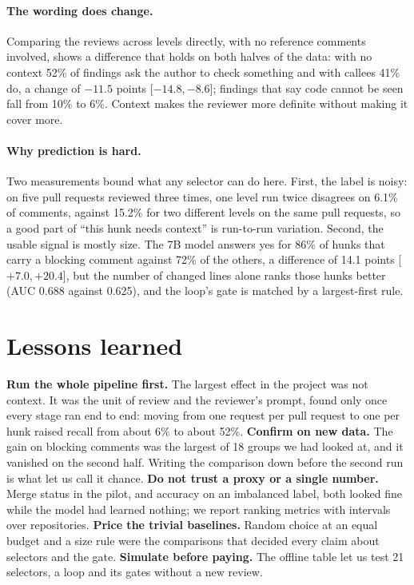 \documentclass{article}
\newcommand{\ci}[2]{[$#1$,\,$#2$]}
\begin{document}
\paragraph{The wording does change.} Comparing the reviews across levels directly, with no reference comments involved, shows a difference that holds on both halves of the data: with no context 52\% of findings ask the author to check something and with callees 41\% do, a change of $-11.5$ points \ci{-14.8}{-8.6}; findings that say code cannot be seen fall from 10\% to 6\%. Context makes the reviewer more definite without making it cover more.

\paragraph{Why prediction is hard.} Two measurements bound what any selector can do here. First, the label is noisy: on five pull requests reviewed three times, one level run twice disagrees on 6.1\% of comments, against 15.2\% for two different levels on the same pull requests, so a good part of ``this hunk needs context'' is run-to-run variation. Second, the usable signal is mostly size. The 7B model answers yes for 86\% of hunks that carry a blocking comment against 72\% of the others, a difference of 14.1 points \ci{+7.0}{+20.4}, but the number of changed lines alone ranks those hunks better (AUC 0.688 against 0.625), and the loop's gate is matched by a largest-first rule.

\section{Lessons learned}
\textbf{Run the whole pipeline first.} The largest effect in the project was not context. It was the unit of review and the reviewer's prompt, found only once every stage ran end to end: moving from one request per pull request to one per hunk raised recall from about 6\% to about 52\%.
\textbf{Confirm on new data.} The gain on blocking comments was the largest of 18 groups we had looked at, and it vanished on the second half. Writing the comparison down before the second run is what let us call it chance.
\textbf{Do not trust a proxy or a single number.} Merge status in the pilot, and accuracy on an imbalanced label, both looked fine while the model had learned nothing; we report ranking metrics with intervals over repositories.
\textbf{Price the trivial baselines.} Random choice at an equal budget and a size rule were the comparisons that decided every claim about selectors and the gate.
\textbf{Simulate before paying.} The offline table let us test 21 selectors, a loop and its gates without a new review.
\end{document}

